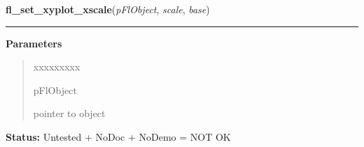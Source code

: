    \label{xformslib:flxyplot:fl_set_xyplot_xscale}

    \vspace{0.5ex}

\hspace{.8\funcindent}\begin{boxedminipage}{\funcwidth}

    \raggedright \textbf{fl\_set\_xyplot\_xscale}(\textit{pFlObject}, \textit{scale}, \textit{base})

    \vspace{-1.5ex}

    \rule{\textwidth}{0.5\fboxrule}
\setlength{\parskip}{2ex}
\setlength{\parskip}{1ex}
      \textbf{Parameters}
      \vspace{-1ex}

      \begin{quote}
        \begin{Ventry}{xxxxxxxxx}

          \item[pFlObject]

          pointer to object

        \end{Ventry}

      \end{quote}

\textbf{Status:} Untested + NoDoc + NoDemo = NOT OK



    \end{boxedminipage}

    \label{xformslib:flxyplot:fl_set_xyplot_yscale}

    \vspace{0.5ex}


